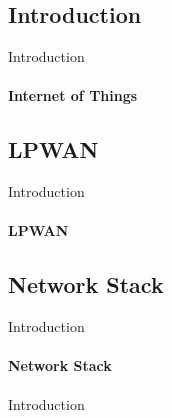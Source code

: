 \subsection{Introduction}

\begin{frame}{Introduction}
\framesubtitle{Internet of Things}

\end{frame}

\subsection{LPWAN}

\begin{frame}{Introduction}
\framesubtitle{LPWAN}

\end{frame}

\subsection{Network Stack}

\begin{frame}{Introduction}
\framesubtitle{Network Stack}

\end{frame}

\begin{frame}{Introduction}
\framesubtitle{}
\end{frame}
